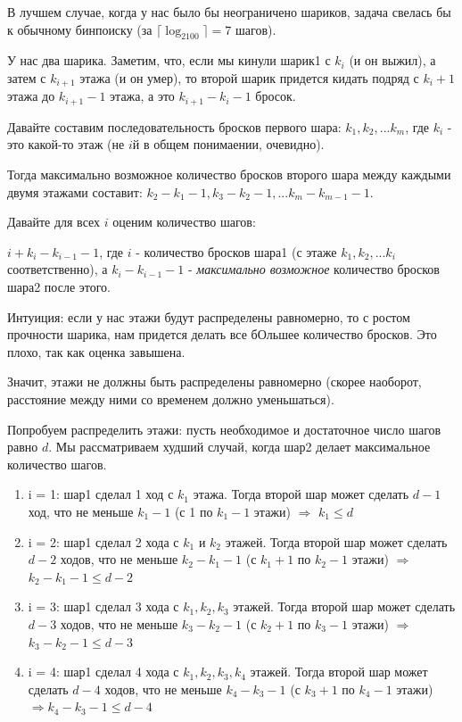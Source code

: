 \documentclass{article}
\begin{document}
В лучшем случае, когда у нас было бы неограничено шариков, задача свелась бы к обычному бинпоиску (за $\lceil \log_2100\rceil = 7$ шагов).

У нас два шарика. Заметим, что, если мы кинули шарик1 с $k_i$ (и он выжил), а затем с $k_{i+1}$ этажа (и он умер), то второй шарик придется кидать подряд с $k_{i} + 1$ этажа до $k_{i+1} -1$ этажа, а это $k_{i+1} - k_i - 1$ бросок.

Давайте составим последовательность бросков первого шара: 
$k_1, k_2, ... k_m$, где $k_i$ - это какой-то этаж (не $i$й в общем понимаении, очевидно).

Тогда максимально возможное количество бросков второго шара между каждыми двумя этажами составит: $k_2 - k_1 -1, k_3 - k_2 - 1, ... k_m - k_{m-1} - 1$.

Давайте для всех $i$ оценим количество шагов:

$i + k_i - k_{i-1} - 1$, где $i$ - количество бросков шара1 (с этаже $k_1, k_2, ... k_i$ соответственно), а $k_i - k_{i-1} - 1$ - \textit{максимально возможное} количество бросков шара2 после этого. 

Интуиция: если у нас этажи будут распределены равномерно, то с ростом прочности шарика, нам придется делать все бОльшее количество бросков. Это плохо, так как оценка завышена.

Значит, этажи не должны быть распределены равномерно (скорее наоборот, расстояние между ними со временем должно уменьшаться).

Попробуем распределить этажи: пусть необходимое и достаточное число шагов равно $d$. Мы рассматриваем худший случай, когда шар2 делает максимальное количество шагов.

\begin{enumerate}
    \item i = 1: шар1 сделал 1 ход с $k_1$ этажа. Тогда второй шар может сделать $d-1$ ход, что не меньше $k_1 - 1$ (с 1 по $k_1 - 1$ этажи) $\Rightarrow $ $k_1 \leq d$
    \item i = 2: шар1 сделал 2 хода с $k_1$ и $k_2$ этажей. Тогда второй шар может сделать $d-2$ ходов, что не меньше $k_2 - k_1- 1$ (с $k_1 + 1$ по $k_2 - 1$ этажи) $\Rightarrow$ $k_2 - k_1 - 1 \leq d - 2$ 
    \item i = 3: шар1 сделал 3 хода с $k_1, k_2, k_3$ этажей. Тогда второй шар может сделать $d-3$ ходов, что не меньше $k_3 - k_2- 1$ (с $k_2 + 1$ по $k_3 - 1$ этажи) $\Rightarrow $ $k_3 - k_2 - 1 \leq d-3$
     \item i = 4: шар1 сделал 4 хода с $k_1, k_2, k_3, k_4$ этажей. Тогда второй шар может сделать $d-4$ ходов, что не меньше $k_4 - k_3- 1$ (с $k_3 + 1$ по $k_4 - 1$ этажи) $\Rightarrow k_4 - k_3 - 1 \leq d-4$
\end{enumerate}
\end{document}
